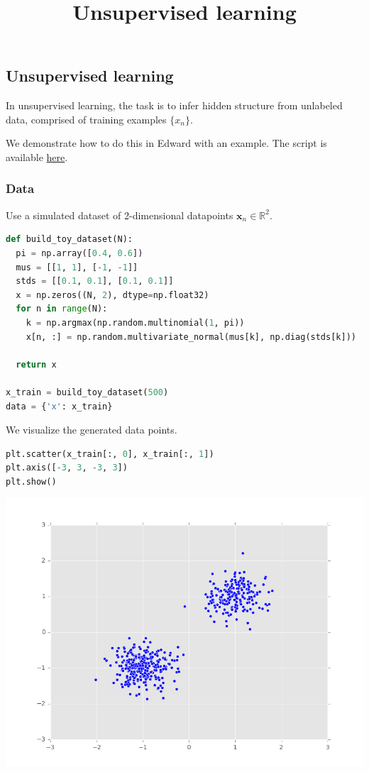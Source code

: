 \title{Unsupervised learning}

\subsection{Unsupervised learning}

In unsupervised learning, the task is to infer hidden structure from
unlabeled data, comprised of training examples $\{x_n\}$.

We demonstrate how to do this in Edward with an example.
The script is available
\href{https://github.com/blei-lab/edward/blob/master/examples/mixture_gaussian.py}
{here}.


\subsubsection{Data}

Use a simulated dataset of 2-dimensional datapoints
$\mathbf{x}_n\in\mathbb{R}^2$.
\begin{lstlisting}[language=Python]
def build_toy_dataset(N):
  pi = np.array([0.4, 0.6])
  mus = [[1, 1], [-1, -1]]
  stds = [[0.1, 0.1], [0.1, 0.1]]
  x = np.zeros((N, 2), dtype=np.float32)
  for n in range(N):
    k = np.argmax(np.random.multinomial(1, pi))
    x[n, :] = np.random.multivariate_normal(mus[k], np.diag(stds[k]))

  return x

x_train = build_toy_dataset(500)
data = {'x': x_train}
\end{lstlisting}

We visualize the generated data points.
\begin{lstlisting}[language=Python]
plt.scatter(x_train[:, 0], x_train[:, 1])
plt.axis([-3, 3, -3, 3])
plt.show()
\end{lstlisting}
\includegraphics[width=700px]{images/unsupervised-fig0.png}

